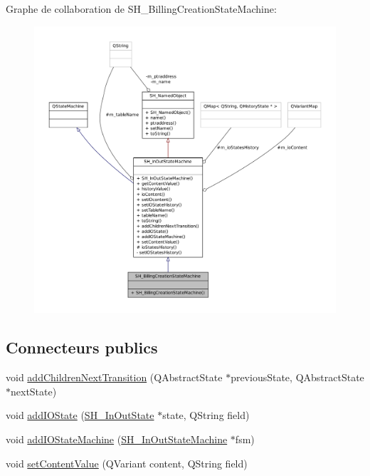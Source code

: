Graphe de collaboration de S\-H\-\_\-\-Billing\-Creation\-State\-Machine\-:
\nopagebreak
\begin{figure}[H]
\begin{center}
\leavevmode
\includegraphics[width=350pt]{classSH__BillingCreationStateMachine__coll__graph}
\end{center}
\end{figure}
\subsection*{Connecteurs publics}
\begin{DoxyCompactItemize}
\item 
void \hyperlink{classSH__InOutStateMachine_a689e5513ef6ef3fc1598efacd413372e}{add\-Children\-Next\-Transition} (Q\-Abstract\-State $\ast$previous\-State, Q\-Abstract\-State $\ast$next\-State)
\item 
void \hyperlink{classSH__InOutStateMachine_ad6b778d052f741daee720c047059ce0e}{add\-I\-O\-State} (\hyperlink{classSH__InOutState}{S\-H\-\_\-\-In\-Out\-State} $\ast$state, Q\-String field)
\item 
void \hyperlink{classSH__InOutStateMachine_a56954869252c7f1980abf37df9919b5e}{add\-I\-O\-State\-Machine} (\hyperlink{classSH__InOutStateMachine}{S\-H\-\_\-\-In\-Out\-State\-Machine} $\ast$fsm)
\item 
void \hyperlink{classSH__InOutStateMachine_aa2766b7a7ba39c35a10df7fc0c151b4f}{set\-Content\-Value} (Q\-Variant content, Q\-String field)
\end{DoxyCompactItemize}
